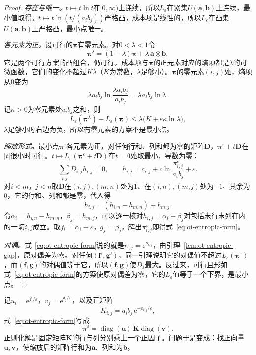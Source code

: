 \begin{proof}
\emph{存在与唯一。}$t\mapsto t\ln t$在$[0,\infty)$上连续，所以$L_\varepsilon$在紧集$U(\bm{a},\bm{b})$上连续，最小值取得。$t\mapsto t\ln(t/(a_ib_j))$严格凸，成本项是线性的，所以$L_\varepsilon$在凸集$U(\bm{a},\bm{b})$上严格凸，最小点唯一。

\emph{各元素为正。}设可行的$\bm{\pi}$有零元素。对$0<\lambda<1$令
\[
 \bm{\pi}^{\lambda}=(1-\lambda)\bm{\pi}+\lambda\,\bm{a}\otimes\bm{b},
\]
它是两个可行方案的凸组合，仍可行。成本项与$\bm{\pi}$的正元素对应的熵项都是$\lambda$的可微函数，它们的变化不超过$K\lambda$（$K$为常数，$\lambda$足够小）。$\bm{\pi}$的零元素$(i,j)$处，熵项从$0$变为
\[
 \lambda a_ib_j\ln\frac{\lambda a_ib_j}{a_ib_j}=\lambda a_ib_j\ln\lambda .
\]
记$\kappa>0$为零元素处$a_ib_j$之和，则
\[
 L_\varepsilon(\bm{\pi}^{\lambda})-L_\varepsilon(\bm{\pi})\leq\lambda\bigl(K+\varepsilon\kappa\ln\lambda\bigr),
\]
$\lambda$足够小时右边为负。所以有零元素的方案不是最小点。

\emph{缩放形式。}最小点$\bm{\pi}^{\varepsilon}$各元素为正，对任何行和、列和都为零的矩阵$\bm{D}$，$\bm{\pi}^{\varepsilon}+t\bm{D}$在$\lvert t\rvert$很小时可行。$t\mapsto L_\varepsilon(\bm{\pi}^{\varepsilon}+t\bm{D})$在$t=0$处取最小，导数为零：
\[
 \sum_{i,j}D_{i,j}h_{i,j}=0,\qquad h_{i,j}=c_{i,j}+\varepsilon\ln\frac{\pi^{\varepsilon}_{i,j}}{a_ib_j}+\varepsilon .
\]
对$i<m$，$j<n$取$\bm{D}$在$(i,j),(m,n)$处为$1$、在$(i,n),(m,j)$处为$-1$、其余为$0$，它的行和、列和都是零，代入得
\[
 h_{i,j}=(h_{i,n}-h_{m,n})+h_{m,j} .
\]
令$\alpha_i=h_{i,n}-h_{m,n}$，$\beta_j=h_{m,j}$，可以逐一核对$h_{i,j}=\alpha_i+\beta_j$对包括末行末列在内的一切$i,j$成立。取$f_i=\alpha_i-\varepsilon$，$g_j=\beta_j$，解出$\pi^{\varepsilon}_{i,j}$即得式~\eqref{eq:ot-entropic-form}。

\emph{对偶。}式~\eqref{eq:ot-entropic-form}说的就是$r_{i,j}=\mathrm{e}^{s_{i,j}}$，由引理~\ref{lem:ot-entropic-gap}，原对偶差为零。对任何$(\bm{f}',\bm{g}')$，同一引理说明它的对偶值不超过$L_\varepsilon(\bm{\pi}^{\varepsilon})$，而$(\bm{f},\bm{g})$的对偶值等于它，所以$(\bm{f},\bm{g})$使$D_\varepsilon$最大。反过来，可行且形如式~\eqref{eq:ot-entropic-form}的方案使原对偶差为零，它的$L_\varepsilon$值等于一个下界，是最小点。
\end{proof}

记$u_i=\mathrm{e}^{f_i/\varepsilon}$，$v_j=\mathrm{e}^{g_j/\varepsilon}$，以及正矩阵
\begin{equation}
 K_{i,j}=a_ib_j\,\mathrm{e}^{-c_{i,j}/\varepsilon},
 \label{eq:ot-gibbs-kernel}
\end{equation}
式~\eqref{eq:ot-entropic-form}写成
\begin{equation}
 \bm{\pi}^{\varepsilon}=\operatorname{diag}(\bm{u})\,\bm{K}\operatorname{diag}(\bm{v}).
 \label{eq:ot-scaling-form}
\end{equation}正则化解是固定矩阵$\bm{K}$的行与列分别乘上一个正因子。问题于是变成：找正向量$\bm{u},\bm{v}$，使缩放后的矩阵行和为$\bm{a}$、列和为$\bm{b}$。

